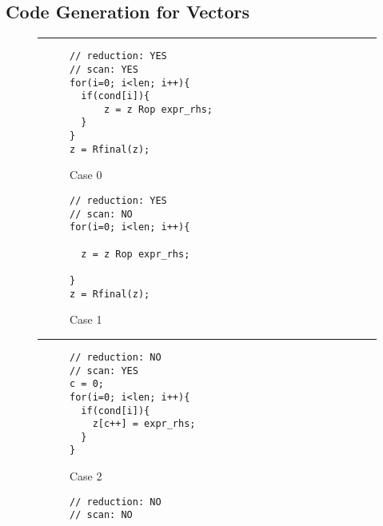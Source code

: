 \subsection{Code Generation for Vectors} \label{SubSec:CodeGen}


\begin{figure}[htbp]
\par\noindent\rule{\columnwidth}{0.6pt}
\begin{subfigure}[t]{.45\columnwidth}
\begin{small}
\begin{verbatim}
// reduction: YES
// scan: YES
for(i=0; i<len; i++){
  if(cond[i]){
      z = z Rop expr_rhs;
  }
}
z = Rfinal(z);
\end{verbatim}
\end{small}
\caption{Case 0} \label{fig:codegen_c0}
\end{subfigure}
\hspace{1mm}
\hspace{2mm}
\begin{subfigure}[t]{.45\columnwidth}
\begin{small}
\begin{verbatim}
// reduction: YES
// scan: NO
for(i=0; i<len; i++){

  z = z Rop expr_rhs;

}
z = Rfinal(z);
\end{verbatim}
\end{small}
\caption{Case 1} \label{fig:codegen_c1}
\end{subfigure}
\vspace{1mm}
\par\noindent\rule{\columnwidth}{0.6pt}
\begin{subfigure}[t]{.45\columnwidth}
\begin{small}
\begin{verbatim}
// reduction: NO
// scan: YES
c = 0;
for(i=0; i<len; i++){
  if(cond[i]){
    z[c++] = expr_rhs;
  }
}
\end{verbatim}
\end{small}
\caption{Case 2} \label{fig:codegen_c2}
\end{subfigure}
\hspace{1mm}
\hspace{2mm}
\begin{subfigure}[t]{.45\columnwidth}
\begin{small}
\begin{verbatim}
// reduction: NO
// scan: NO


\end{verbatim}
\end{small}
\end{subfigure}
\end{figure}
